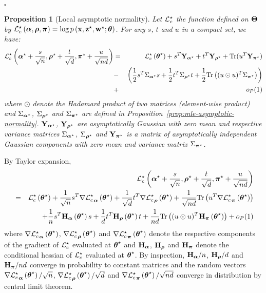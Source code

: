 \documentclass[bj]{imsart}
\numberwithin{equation}{section}
\theoremstyle{plain}
\newtheorem{proposition}[thm]{Proposition}
\theoremstyle{remark}
\begin{document}
\begin{flushright}
$\square$
\end{flushright}

\begin{proposition}[Local asymptotic normality]\label{prop:LocalAsymp}
Let $\mathcal{L}_c^{\star}$ the function defined on $\boldsymbol{\Theta}$ by $\mathcal{L}_c^{\star}\left(\boldsymbol{\alpha},\boldsymbol{\rho},\boldsymbol{\pi}\right)=\log p\left(\mathbf{x},\mathbf{z}^\star,\mathbf{w}^\star;\boldsymbol{\theta}\right)$. For any $s$, $t$ and $u$ in a compact set, we have:
\begin{eqnarray*}
\Lcs\left(\bpis+\frac{s}{\sqrt{\n}},\brhos+\frac{t}{\sqrt{\dd}},\bals+\frac{u}{\sqrt{\n\dd}}\right)
&=&\Lcs\left(\bthetas\right) + s\transpose\bY_{\bpis}+t\transpose\bY_{\brhos}+ \text{Tr}(u\transpose\bY_{\bals})\\
& -&\left(\frac{1}{2}s\transpose\Sig_{\bpis}s+\frac{1}{2}t\transpose\Sig_{\brhos}t+\frac{1}{2} \text{Tr}\left((u \odot u)\transpose\Sig_{\bals}\right)\right)\\
&+&o_{P}(1)\\
\end{eqnarray*}
where $\odot$ denote the Hadamard product of two matrices (element-wise product) and $\Sigma_{\boldsymbol{\alpha}^\star}$, $\Sigma_{\boldsymbol{\rho}^\star}$ and $\Sigma_{\boldsymbol{\pi}^\star}$ are defined in Proposition~\ref{prop:mle-asymptotic-normality}. $\mathbf{Y}_{\boldsymbol{\alpha}^\star}$, $\mathbf{Y}_{\boldsymbol{\rho}^\star}$ are asymptotically Gaussian with zero mean and respective variance matrices $\Sigma_{\boldsymbol{\alpha}^\star}$, $\Sigma_{\boldsymbol{\rho}^\star}$ and $\mathbf{Y}_{\boldsymbol{\pi}^\star}$ is a matrix of asymptotically independent Gaussian components with zero mean and variance matrix $\Sigma_{\boldsymbol{\pi}^\star}$.
\end{proposition}
\proofbegin
By Taylor expansion,
\begin{eqnarray*}
& &\!\!\!\!\!\!\!\!\!\!\Lcs\left(\bpis+\frac{s}{\sqrt{\n}},\brhos+\frac{t}{\sqrt{\dd}},\bals+\frac{u}{\sqrt{\n\dd}}\right)\\
&=&\Lcs\left(\bthetas\right)+\frac{1}{\sqrt{\n}}s\transpose\nabla{\Lcs}_{\bpi}\left(\bthetas\right) +\frac{1}{\sqrt{\dd}}t\transpose\nabla{\Lcs}_{\brho}\left(\bthetas\right)+\frac{1}{\sqrt{\n\dd}}\text{Tr}\left(u\transpose\nabla{\Lcs}_{\bal}\left(\bthetas\right)\right)\\
&&\quad+\frac{1}{\n}s\transpose\bH_{\bpi}\left(\bthetas\right)s+\frac{1}{\dd}t\transpose\bH_{\brho}\left(\bthetas\right)t +\frac{1}{\n\dd}\text{Tr}\left((u \odot u)\transpose\bH_{\bal}\left(\bthetas\right)\right)+o_{P}(1)\\
\end{eqnarray*}
where $\nabla{\mathcal{L}_c^{\star}}_{\boldsymbol{\alpha}}\left(\boldsymbol{\theta}^\star\right)$, $\nabla{\mathcal{L}_c^{\star}}_{\boldsymbol{\rho}}\left(\boldsymbol{\theta}^\star\right)$ and $\nabla{\mathcal{L}_c^{\star}}_{\boldsymbol{\pi}}\left(\boldsymbol{\theta}^\star\right)$ denote the respective components of the gradient of $\mathcal{L}_c^{\star}$ evaluated at $\boldsymbol{\theta}^\star$ and $\mathbf{H}_{\boldsymbol{\alpha}}$, $\mathbf{H}_{\boldsymbol{\rho}}$ and $\mathbf{H}_{\boldsymbol{\pi}}$ denote the conditional hessian of $\mathcal{L}_c^{\star}$ evaluated at $\boldsymbol{\theta}^\star$. By inspection, $\mathbf{H}_{\boldsymbol{\alpha}}/n$, $\mathbf{H}_{\boldsymbol{\rho}}/d$ and $\mathbf{H}_{\boldsymbol{\pi}}/nd$ converge in probability to constant matrices and the random vectors $\nabla{\mathcal{L}_c^{\star}}_{\boldsymbol{\alpha}}\left(\boldsymbol{\theta}^\star\right)/\sqrt{n}$, $\nabla{\mathcal{L}_c^{\star}}_{\boldsymbol{\rho}}\left(\boldsymbol{\theta}^\star\right)/\sqrt{d}$ and $\nabla{\mathcal{L}_c^{\star}}_{\boldsymbol{\pi}}\left(\boldsymbol{\theta}^\star\right)/\sqrt{nd}$ converge in distribution by central limit theorem. %
\proofend
\end{document}
